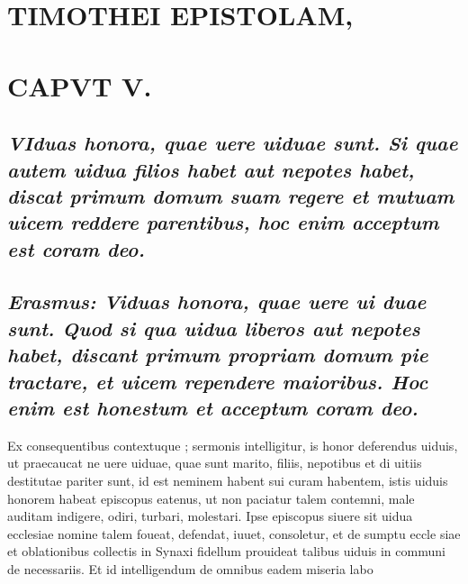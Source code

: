 \documentclass{article}
\begin{document}
\begin{pages}
\section*{TIMOTHEI EPISTOLAM, }
\marginpar{[ p.117 ]}
\endnumbering\beginnumbering\section{CAPVT V.}
{}
\subsection*{\textit{\huge\textbf{V}\normalsize Iduas honora, quae uere uiduae sunt. Si quae autem uidua filios habet aut nepotes habet, discat primum domum suam regere et mutuam uicem reddere parentibus, hoc enim acceptum est coram deo. }}
{}
\subsection*{\textit{Erasmus: Viduas honora, quae uere ui duae sunt. Quod si qua uidua liberos aut nepotes habet, discant primum propriam domum pie tractare, et uicem rependere maioribus. Hoc enim est honestum et acceptum coram deo. }}\pstart Ex consequentibus contextuque ; sermonis intelligitur, is honor deferendus uiduis, ut praecaucat ne uere uiduae, quae sunt marito, filiis, nepotibus et di uitiis destitutae pariter sunt, id est neminem habent sui curam habentem, istis uiduis honorem habeat episcopus eatenus, ut non paciatur talem contemni, male auditam indigere, odiri, turbari, molestari. Ipse episcopus siuere sit uidua ecclesiae nomine talem foueat, defendat, iuuet, consoletur, et de sumptu eccle siae et oblationibus collectis in Synaxi fidellum prouideat talibus uiduis in communi de necessariis. Et id intelligendum de omnibus eadem miseria labo\pend

\end{pages}
\end{document}
